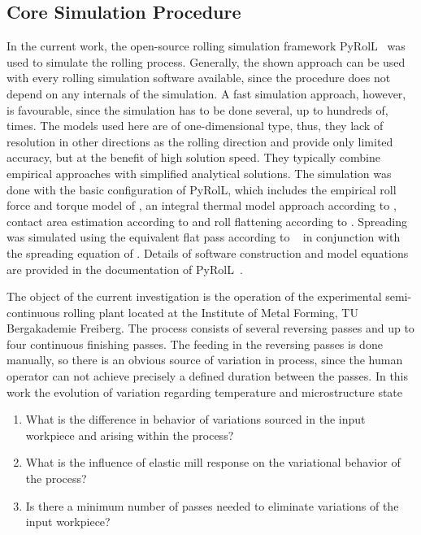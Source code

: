 \subsection{Core Simulation Procedure}\label{subsec:simulation-procedure}

In the current work, the open-source rolling simulation framework PyRolL~\cite{pyroll2} was used to simulate the rolling process.
Generally, the shown approach can be used with every rolling simulation software available, since the procedure does not depend on any internals of the simulation.
A fast simulation approach, however, is favourable, since the simulation has to be done several, up to hundreds of, times.
The models used here are of one-dimensional type, thus, they lack of resolution in other directions as the rolling direction and provide only limited accuracy, but at the benefit of high solution speed.
They typically combine empirical approaches with simplified analytical solutions.
The simulation was done with the basic configuration of PyRolL, which includes the empirical roll force and torque model of \textcite{Hensel1978}, an integral thermal model approach according to \textcite{Hensel1990}, contact area estimation according to \textcite{Zouhar1960} and roll flattening according to \textcite{Hitchcock1935}.
Spreading was simulated using the equivalent flat pass according to \citeauthor*{Lendl1948}~\cite{Lendl1948, Lendl1948a, Lendl1949} in conjunction with the spreading equation of \textcite{Wusatowski1969}.
Details of software construction and model equations are provided in the documentation of PyRolL~\cite{pyroll}.

The object of the current investigation is the operation of the experimental semi-continuous rolling plant located at the Institute of Metal Forming, TU Bergakademie Freiberg.
The process consists of several reversing passes and up to four continuous finishing passes.
The feeding in the reversing passes is done manually, so there is an obvious source of variation in process, since the human operator can not achieve precisely a defined duration between the passes.
In this work the evolution of variation regarding temperature and microstructure state

\begin{enumerate}
    \item What is the difference in behavior of variations sourced in the input workpiece and arising within the process?
    \item What is the influence of elastic mill response on the variational behavior of the process?
    \item Is there a minimum number of passes needed to eliminate variations of the input workpiece?
\end{enumerate}
